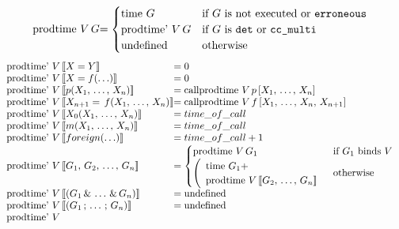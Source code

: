 \begin{algorithm}
\[
\begin{array}{l @{}l @{}l}
\prodtime V\,& G                            &=
    \begin{cases}
        \timef G         & \text{if } G \text{ is not executed or
                            \derroneous} \\
        \prodtimep V\,G  & \text{if } G \text{ is \ddet or \dccmulti} \\
        \undef           & \text{otherwise}
    \end{cases} \\
\end{array}
\]
\[
\begin{array}{l @{}l @{}l}
\prodtimep V\,& \pat{X = Y}                        &= 0 \\
\prodtimep V\,& \pat{X = f(\ldots)}                &= 0 \\
\prodtimep V\,& \pat{p(X_1,\,\ldots,\,X_n)}        &=
    \callprodtime V\,p\,[X_1,\,\ldots,\,X_n] \\
\prodtimep V\,& \pat{X_{n+1} = \,f(X_1,\,\ldots,\,X_n)}  &=
    \callprodtime V\,f\,[X_1,\,\ldots,\,X_n,\,X_{n+1}] \\
\prodtimep V\,& \pat{X_0(X_1,\,\ldots,\,X_n)}      &= time\_of\_call \\
\prodtimep V\,& \pat{m(X_1,\,\ldots,\,X_n)}        &= time\_of\_call \\
\prodtimep V\,& \pat{foreign(\ldots)}              &= time\_of\_call + 1 \\
\prodtimep V\,& \pat{G_1,\,G_2,\,\ldots,\,G_n}     &=
   \begin{cases}
       \prodtime V\,G_1
            & \text{if } G_1 \text{ binds } V \\
       \left(
       \begin{array}{l}
           \timef G_1 + \\ \prodtime V\,\pat{G_2,\,\ldots,\,G_n}
       \end{array}
       \right.
            & \text{otherwise}
   \end{cases} \\
\prodtimep V\,& \pat{(G_1\,\&\,\ldots\,\&\,G_n)}   &= \undef \\
\prodtimep V\,& \pat{(G_1\,;\,\ldots\,;\,G_n)}     &= \undef \\
\prodtimep V\,& 

\end{array}\]
\end{algorithm}
